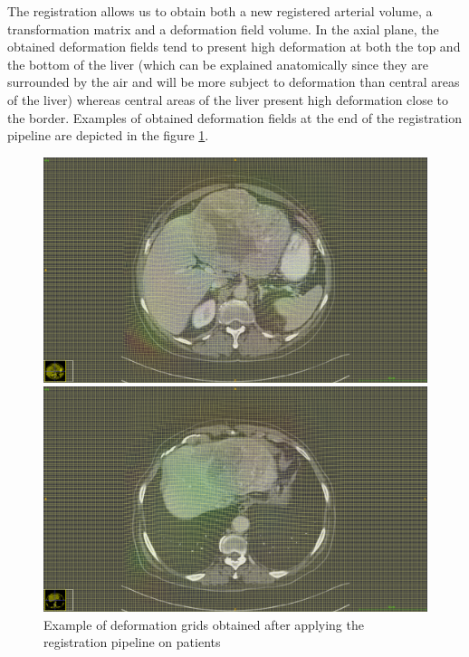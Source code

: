 The registration allows us to obtain both a new registered arterial volume, a transformation matrix and a deformation field volume. In the axial plane, the obtained deformation fields tend to present high deformation at both the top and the bottom of the liver (which can be explained anatomically since they are surrounded by the air and will be more subject to deformation than central areas of the liver) whereas central areas of the liver present high deformation close to the border. Examples of obtained deformation fields at the end of the registration pipeline are depicted in the figure \ref{fig:deformationGridExamples}.

\begin{figure}
\centering
\begin{minipage}{0.7\linewidth}
\includegraphics[width=\linewidth]{./images/TCIA_TCGA-DD-A11A_deformation_grid_slice49}
\end{minipage}

\vspace{0.8cm}
\begin{minipage}{0.7\linewidth}
\includegraphics[width=\linewidth]{./images/TCIA_TCGA-DD-A11A_deformation_grid_slice68}
\end{minipage}
\caption{Example of deformation grids obtained after applying the registration pipeline on  patients}
\label{fig:deformationGridExamples}
\end{figure}
